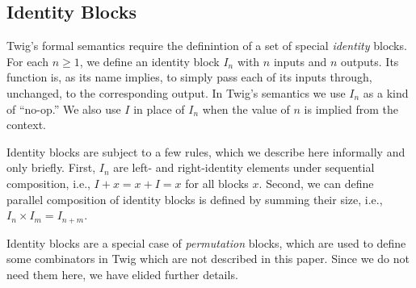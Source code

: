 \subsection{Identity Blocks}

Twig's formal semantics require the definintion of a set of special \emph{identity} blocks. For each $n \geq 1$, we define an identity block $I_n$ with $n$ inputs and $n$ outputs. Its function is, as its name implies, to simply pass each of its inputs through, unchanged, to the corresponding output. In Twig's semantics we use $I_n$ as a kind of ``no-op.'' We also use $I$ in place of $I_n$ when the value of $n$ is implied from the context.

Identity blocks are subject to a few rules, which we describe here informally and only briefly. First, $I_n$ are left- and right-identity elements under sequential composition, i.e., $I + x = x + I = x$ for all blocks $x$. Second, we can define parallel composition of identity blocks is defined by summing their size, i.e., $I_n \times I_m = I_{n + m}$.

Identity blocks are a special case of \emph{permutation} blocks, which are used to define some combinators in Twig which are not described in this paper. Since we do not need them here, we have elided further details.
